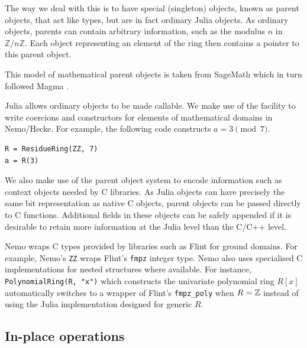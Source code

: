 \documentclass{sig-alternate-05-2015}
\begin{document}
The way we deal with this is to have special (singleton) objects, known as parent objects, that act
like types, but are in fact ordinary Julia objects. As ordinary objects, parents can contain
arbitrary information, such as the modulus $n$ in $\mathbb{Z}/n\mathbb{Z}$. Each object representing
an element of the ring then contains a pointer to this parent object.

This model of mathematical parent objects is taken from SageMath \cite{sage} which in turn followed
Magma \cite{magma}.

Julia allows ordinary objects to be made callable. We make use of the facility to write coercions
and constructors for elements of mathematical domains in Nemo/Hecke. For example, the following
code constructs $a = 3 \pmod{7}$.

\begin{small}
\begin{verbatim}
R = ResidueRing(ZZ, 7)
a = R(3)
\end{verbatim}
\end{small}

We also make use of the parent object system to encode information such as context objects needed
by C libraries. As Julia objects can have precisely the same bit representation as native C objects,
parent objects can be passed directly to C functions. Additional fields in these objects can be safely
appended if it is desirable to retain more information at the Julia level than the C/C++ level.

Nemo wraps C types provided by libraries such as Flint
for ground domains.
For example, Nemo's \texttt{ZZ} wraps Flint's \texttt{fmpz}
integer type.
Nemo also uses specialised C implementations for nested structures
where available.
For instance, \texttt{PolynomialRing(R, "x")} which constructs
the univariate polynomial ring $R[x]$ automatically switches to
a wrapper of Flint's \texttt{fmpz\_poly} when $R = \mathbb{Z}$
instead of using the Julia implementation designed for generic $R$.

\subsection{In-place operations}
\end{document}
